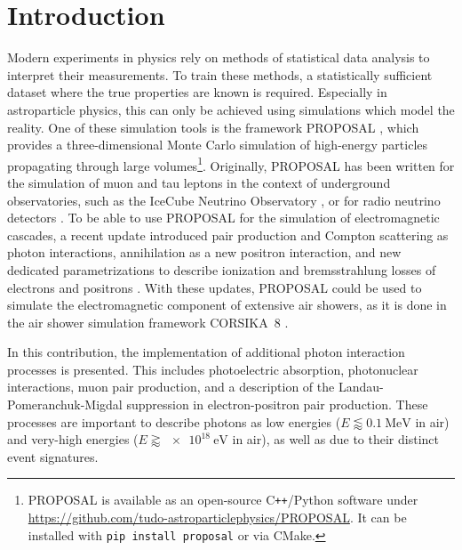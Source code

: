 \section{Introduction}

Modern experiments in physics rely on methods of statistical data analysis to interpret their measurements.
To train these methods, a statistically sufficient dataset where the true properties are known is required.
Especially in astroparticle physics, this can only be achieved using simulations which model the reality.
One of these simulation tools is the framework PROPOSAL \cite{KOEHNE20132070}, which provides a three-dimensional Monte Carlo simulation of high-energy particles propagating through large volumes\footnote{PROPOSAL is available as an open-source C\texttt{++}/Python software under \url{https://github.com/tudo-astroparticlephysics/PROPOSAL}. It can be installed with \texttt{pip install proposal} or via CMake.}.
Originally, PROPOSAL has been written for the simulation of muon and tau leptons in the context of underground observatories, such as the IceCube Neutrino Observatory \cite{IceCube:2021uhz}, or for radio neutrino detectors \cite{PhysRevD.102.083011}.
To be able to use PROPOSAL for the simulation of electromagnetic cascades, a recent update introduced pair production and Compton scattering as photon interactions, annihilation as a new positron interaction, and new dedicated parametrizations to describe ionization and bremsstrahlung losses of electrons and positrons \cite{Alameddine:2021iq}.
With these updates, PROPOSAL could be used to simulate the electromagnetic component of extensive air showers, as it is done in the air shower simulation framework CORSIKA~8 \cite{icrc2023}. 

In this contribution, the implementation of additional photon interaction processes is presented.
This includes photoelectric absorption, photonuclear interactions, muon pair production, and a description of the Landau-Pomeranchuk-Migdal suppression in electron-positron pair production.
These processes are important to describe photons as low energies ($E \lessapprox \SI{0.1}{\mega\electronvolt}$ in air) and very-high energies ($E \gtrapprox \SI{e18}{\electronvolt}$ in air), as well as due to their distinct event signatures.